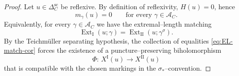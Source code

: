 \documentclass[a4paper,12pt]{amsart}
\DeclareMathOperator{\Ext}{Ext}
\theoremstyle{plain}
\theoremstyle{definition}
\begin{document}
\begin{proof}
Let $u\in\Delta_C^{\mathrm{sc}}$ be reflexive. By definition of reflexivity, $H(u)=0$, hence
\[
m_\gamma(u)=0\qquad\text{for every }\gamma\in\mathcal A_C.
\]
Equivalently, for every $\gamma\in\mathcal A_C$ we have the extremal--length matching
\begin{equation}\label{eq:EL-match-cor}
\Ext_{\mathrm{I}}(u;\gamma)=\Ext_{\mathrm{II}}(u;\gamma^\sigma).
\end{equation}
By the Teichm\"uller separating hypothesis, the collection of equalities \eqref{eq:EL-match-cor} forces the existence of a
puncture--preserving biholomorphism
\[
\Phi:\,X^{\mathrm{I}}(u)\longrightarrow X^{\mathrm{II}}(u)
\]
that is compatible with the chosen markings in the $\sigma_\ast$--convention.
\end{proof}
\end{document}
